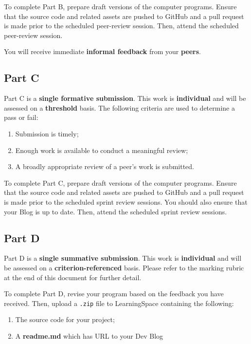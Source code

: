 \documentclass{../../fal_assignment}
\begin{document}
To complete Part B, prepare draft versions of the computer programs. Ensure that the source code and related assets are pushed to GitHub and a pull request is made prior to the scheduled peer-review session. Then, attend the scheduled peer-review session.

You will receive immediate \textbf{informal feedback} from your \textbf{peers}.

\subsection*{Part C}

Part C is a \textbf{single formative submission}. This work is \textbf{individual} and will be assessed on a \textbf{threshold} basis. The following criteria are used to determine a pass or fail:

\begin{enumerate}[label=(\alph*)]
	\item Submission is timely;
	\item Enough work is available to conduct a meaningful review;
	\item A broadly appropriate review of a peer's work is submitted.
\end{enumerate}

To complete Part C, prepare draft versions of the computer programs. Ensure that the source code and related assets are pushed to GitHub and a pull request is made prior to the scheduled sprint review sessions. You should also ensure that your Blog is up to date.  Then, attend the scheduled sprint review sessions.

\subsection*{Part D}

Part D is a \textbf{single summative submission}. This work is \textbf{individual} and will be assessed on a \textbf{criterion-referenced} basis. Please refer to the marking rubric at the end of this document for further detail.

To complete Part D, revise your program based on the feedback you have received. Then, upload a \texttt{.zip} file to LearningSpace containing the following:

\begin{enumerate}[label=(\alph*)]
	\item The source code for your project;
	\item A \textbf{readme.md} which has URL to your Dev Blog
\end{enumerate}
\end{document}
